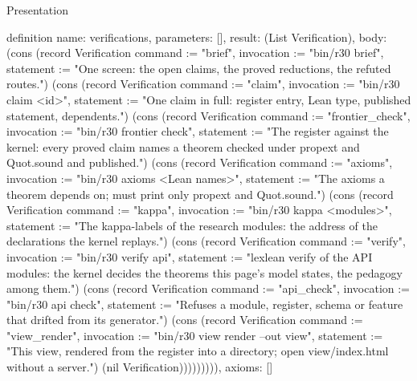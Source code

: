 \begin{lexlean}{Presentation}
\begin{semanticmodule}
definition{
  name: verifications,
  parameters: [],
  result: (List Verification),
  body: (cons (record Verification {command := "brief", invocation := "bin/r30 brief", statement := "One screen: the open claims, the proved reductions, the refuted routes."}) (cons (record Verification {command := "claim", invocation := "bin/r30 claim <id>", statement := "One claim in full: register entry, Lean type, published statement, dependents."}) (cons (record Verification {command := "frontier_check", invocation := "bin/r30 frontier check", statement := "The register against the kernel: every proved claim names a theorem checked under propext and Quot.sound and published."}) (cons (record Verification {command := "axioms", invocation := "bin/r30 axioms <Lean names>", statement := "The axioms a theorem depends on; must print only propext and Quot.sound."}) (cons (record Verification {command := "kappa", invocation := "bin/r30 kappa <modules>", statement := "The kappa-labels of the research modules: the address of the declarations the kernel replays."}) (cons (record Verification {command := "verify", invocation := "bin/r30 verify api", statement := "lexlean verify of the API modules: the kernel decides the theorems this page's model states, the pedagogy among them."}) (cons (record Verification {command := "api_check", invocation := "bin/r30 api check", statement := "Refuses a module, register, schema or feature that drifted from its generator."}) (cons (record Verification {command := "view_render", invocation := "bin/r30 view render --out view", statement := "This view, rendered from the register into a directory; open view/index.html without a server."}) (nil Verification))))))))),
  axioms: []
}


\end{semanticmodule}
\end{lexlean}
